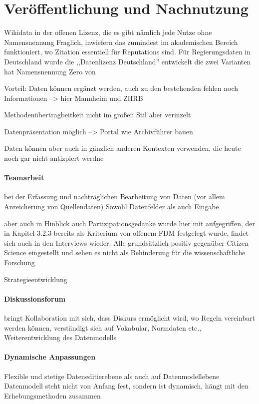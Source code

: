 \section{Veröffentlichung und Nachnutzung}

Wikidata in der offenen Lizenz, die es gibt nämlich jede Nutze ohne Namensnennung
Fraglich, inwiefern das zumindest im akademischen Bereich funktioniert, wo Zitation essentiell für Reputations sind.
Für Regierungsdaten in Deutschland wurde die ,,Datenlizenz Deutschland'' entwickelt die zwei Varianten hat
Namensnennung
Zero 
von  

Vorteil: Daten können ergänzt werden, auch zu den bestehenden fehlen noch Informationen --> hier Mannheim und ZHRB

Methodenübertragbeitkeit nicht im großen Stil aber verinzelt

Datenpräsentation möglich --> Portal wie Archivführer bauen 

Daten können aber auch in gänzlich anderen Kontexten verwenden, die heute noch gar nicht antizpiert werdne


\paragraph{Teamarbeit}
bei der Erfassung und nachträglichen Bearbeitung von Daten (vor allem Anreicherung von Quellendaten)
Sowohl Datenfelder als auch Eingabe

aber auch in Hinblick auch Partizipationsgedanke wurde hier mit aufgegriffen, der in Kapitel 3.2.3 bereits als Kriterium von offenem FDM festgelegt wurde, findet sich auch in den Interviews wieder. Alle grundsätzlich positiv gegenüber Citizen Science eingestellt und sehen es nicht als Behinderung für die wissenschaftliche Forschung 

Strategieentwicklung

\paragraph{Diskussionsforum}
bringt Kollaboration mit sich, dass Diskurs ermöglicht wird, wo Regeln vereinbart werden können, verständigt sich auf Vokabular, Normdaten etc., Weiterentwicklung des Datenmodells
\paragraph{Dynamische Anpassungen}
Flexible und stetige 
Dateneditierebene als auch auf Datenmodellebene
Datenmodell steht nicht von Anfang fest, sondern ist dynamisch, hängt mit den Erhebungsmethoden zusammen
